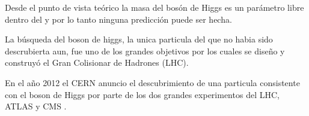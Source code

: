 



Desde el punto de vista teórico la masa del bosón de Higgs es un parámetro
libre dentro del {\SM} y por lo tanto ninguna predicción puede ser hecha.

La b\'usqueda del boson de higgs, la unica particula del {\SM} que
no habia sido descrubierta aun, fue uno de los grandes objetivos por los
cuales se dise\~no y construyó el Gran Colisionar de Hadrones (LHC).


En el a\~no 2012 el CERN anuncio el descubrimiento de una particula
consistente con el boson de Higgs por parte de los dos grandes
experimentos del LHC, ATLAS y CMS \cite{Aad:2012tfa,Chatrchyan:2012ufa}.

